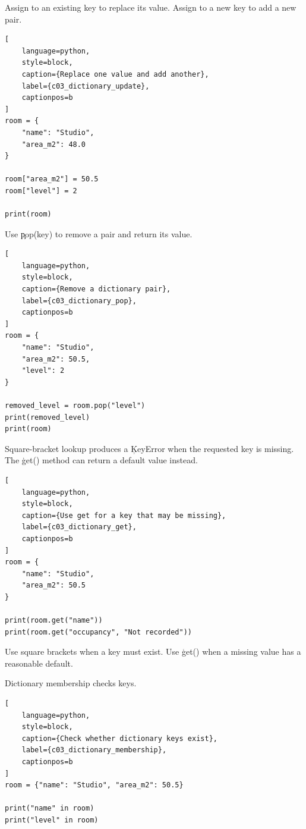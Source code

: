 
Assign to an existing key to replace its value. Assign to a new key to add a
new pair.

\begin{lstlisting}[
    language=python,
    style=block,
    caption={Replace one value and add another},
    label={c03_dictionary_update},
    captionpos=b
]
room = {
    "name": "Studio",
    "area_m2": 48.0
}

room["area_m2"] = 50.5
room["level"] = 2

print(room)
\end{lstlisting}

Use \c{pop(key)} to remove a pair and return its value.

\begin{lstlisting}[
    language=python,
    style=block,
    caption={Remove a dictionary pair},
    label={c03_dictionary_pop},
    captionpos=b
]
room = {
    "name": "Studio",
    "area_m2": 50.5,
    "level": 2
}

removed_level = room.pop("level")
print(removed_level)
print(room)
\end{lstlisting}


Square-bracket lookup produces a \c{KeyError} when the requested key is
missing. The \c{get()} method can return a default value instead.

\begin{lstlisting}[
    language=python,
    style=block,
    caption={Use get for a key that may be missing},
    label={c03_dictionary_get},
    captionpos=b
]
room = {
    "name": "Studio",
    "area_m2": 50.5
}

print(room.get("name"))
print(room.get("occupancy", "Not recorded"))
\end{lstlisting}

Use square brackets when a key must exist. Use \c{get()} when a missing value
has a reasonable default.

Dictionary membership checks keys.

\begin{lstlisting}[
    language=python,
    style=block,
    caption={Check whether dictionary keys exist},
    label={c03_dictionary_membership},
    captionpos=b
]
room = {"name": "Studio", "area_m2": 50.5}

print("name" in room)
print("level" in room)
\end{lstlisting}

